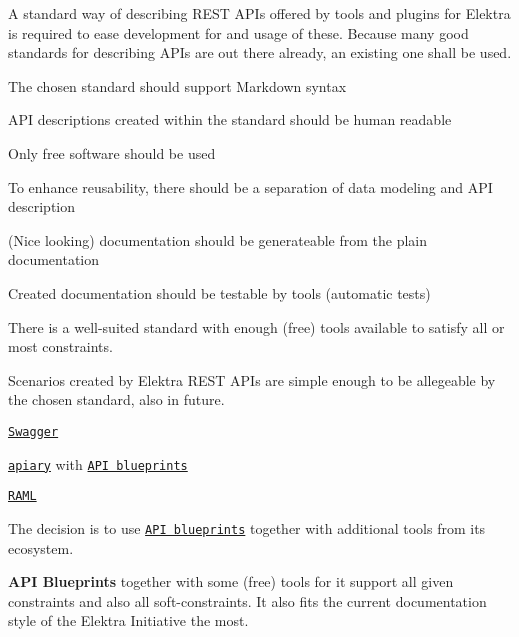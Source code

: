 A standard way of describing R\+E\+ST A\+P\+Is offered by tools and plugins for Elektra is required to ease development for and usage of these. Because many good standards for describing A\+P\+Is are out there already, an existing one shall be used.


\begin{DoxyItemize}
\item The chosen standard should support Markdown syntax
\item A\+PI descriptions created within the standard should be human readable
\item Only free software should be used
\item To enhance reusability, there should be a separation of data modeling and A\+PI description
\end{DoxyItemize}


\begin{DoxyItemize}
\item (Nice looking) documentation should be generateable from the plain documentation
\item Created documentation should be testable by tools (automatic tests)
\end{DoxyItemize}


\begin{DoxyItemize}
\item There is a well-\/suited standard with enough (free) tools available to satisfy all or most constraints.
\item Scenarios created by Elektra R\+E\+ST A\+P\+Is are simple enough to be allegeable by the chosen standard, also in future.
\end{DoxyItemize}


\begin{DoxyItemize}
\item \href{http://swagger.io/}{\tt Swagger}
\item \href{https://apiary.io/}{\tt apiary} with \href{https://apiblueprint.org/}{\tt A\+PI blueprints}
\item \href{http://raml.org/}{\tt R\+A\+ML}
\end{DoxyItemize}

The decision is to use \href{https://apiblueprint.org/}{\tt A\+PI blueprints} together with additional tools from its ecosystem.

{\bfseries A\+PI Blueprints} together with some (free) tools for it support all given constraints and also all soft-\/constraints. It also fits the current documentation style of the Elektra Initiative the most.

